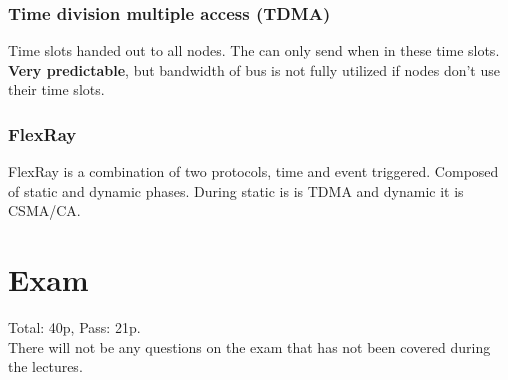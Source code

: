 \documentclass[a4paper]{article}
\begin{document}
\subsubsection{Time division multiple access (TDMA)}
Time slots handed out to all nodes. The can only send when in these time slots.
\textbf{Very predictable}, but bandwidth of bus is not fully utilized if nodes
don't use their time slots.
\subsubsection{FlexRay}
FlexRay is a combination of two protocols, time and event triggered. Composed of
static and dynamic phases. During static is is TDMA and dynamic it is CSMA/CA.
\section{Exam}
Total: 40p, Pass: 21p.\\
There will not be any questions on the exam that has not been covered during the
lectures.
\end{document}
